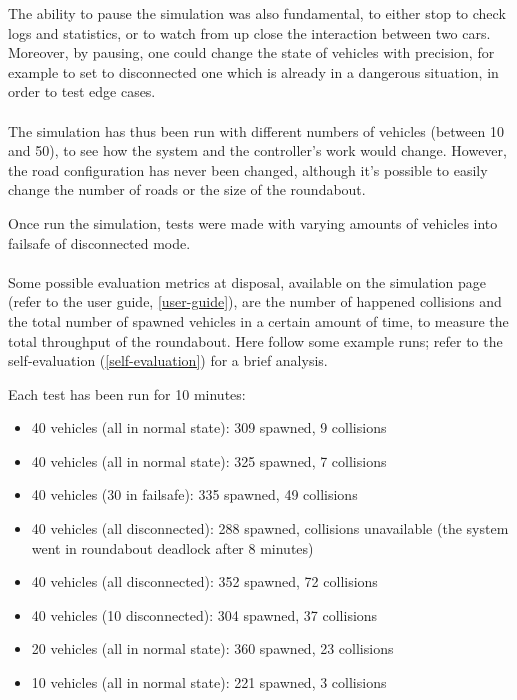 The ability to pause the simulation was also fundamental, to either stop to
check logs and statistics, or to watch from up close the interaction between two
cars. Moreover, by pausing, one could change the state of vehicles with
precision, for example to set to disconnected one which is already in a
dangerous situation, in order to test edge cases.
\\
\\
The simulation has thus been run with different numbers of vehicles (between 10
and 50), to see how the system and the controller's work would change. However,
the road configuration has never been changed, although it's possible to easily
change the number of roads or the size of the roundabout.

Once run the simulation, tests were made with varying amounts of vehicles into
failsafe of disconnected mode.
\\
\\
Some possible evaluation metrics at disposal, available on the simulation page
(refer to the user guide, \ref{user-guide}), are the number of happened
collisions and the total number of spawned vehicles in a certain amount of time,
to measure the total throughput of the roundabout. Here follow some example
runs; refer to the self-evaluation (\ref{self-evaluation}) for a brief analysis.

Each test has been run for 10 minutes:
\begin{itemize}
  \item 40 vehicles (all in normal state): 309 spawned, 9 collisions
  \item 40 vehicles (all in normal state): 325 spawned, 7 collisions
  \item 40 vehicles (30 in failsafe): 335 spawned, 49 collisions

  \item 40 vehicles (all disconnected): 288 spawned, collisions unavailable (the
  system went in roundabout deadlock after 8 minutes)
  \item 40 vehicles (all disconnected): 352 spawned, 72 collisions
  \item 40 vehicles (10 disconnected): 304 spawned, 37 collisions

  \item 20 vehicles (all in normal state): 360 spawned, 23 collisions
  \item 10 vehicles (all in normal state): 221 spawned, 3 collisions
\end{itemize}
